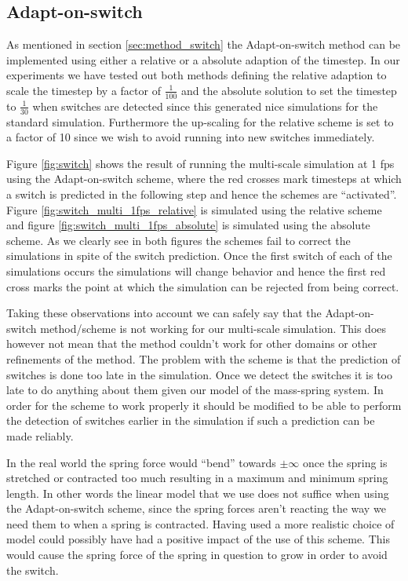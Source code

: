 \documentclass[11pt]{article}
\begin{document}
\subsection{Adapt-on-switch}
\label{sec:experiment_switch}
As mentioned in section \ref{sec:method_switch} the Adapt-on-switch method
can be implemented using either a relative or a absolute adaption of the
timestep. In our experiments we have tested out both methods defining the
relative adaption to scale the timestep by a factor of $\frac{1}{100}$ and
the absolute solution to set the timestep to $\frac{1}{30}$ when switches are
detected since this generated nice simulations for the standard simulation.
Furthermore the up-scaling for the relative scheme is set to a factor of 10
since we wish to avoid running into new switches immediately.

Figure \ref{fig:switch} shows the result of running the multi-scale
simulation at 1 fps using the Adapt-on-switch scheme, where the
red crosses mark timesteps at which a switch is predicted in the
following step and hence the schemes are ``activated''. Figure
\ref{fig:switch_multi_1fps_relative} is simulated using the relative scheme
and figure \ref{fig:switch_multi_1fps_absolute} is simulated using the
absolute scheme. As we clearly see in both figures the schemes fail to correct
the simulations in spite of the switch prediction. Once the first switch of
each of the simulations occurs the simulations will change behavior and hence
the first red cross marks the point at which the simulation can be rejected
from being correct.

Taking these observations into account we can safely say that the
Adapt-on-switch method/scheme is not working for our multi-scale simulation. This does
however not mean that the method couldn't work for other domains or other
refinements of the method. The problem with the scheme is that the prediction
of switches is done too late in the simulation. Once we detect the switches
it is too late to do anything about them given our model of the mass-spring
system. In order for the scheme to work properly it should be modified to be
able to perform the detection of switches earlier in the simulation if such a
prediction can be made reliably.

In the real world the spring force would ``bend'' towards $\pm \infty$ once
the spring is stretched or contracted too much resulting in a maximum and
minimum spring length. In other words the linear model that we use does not
suffice when using the Adapt-on-switch scheme, since the spring forces aren't
reacting the way we need them to when a spring is contracted. Having used a
more realistic choice of model could possibly have had a positive impact of
the use of this scheme. This would cause the spring force of the spring
in question to grow in order to avoid the switch.
\end{document}
